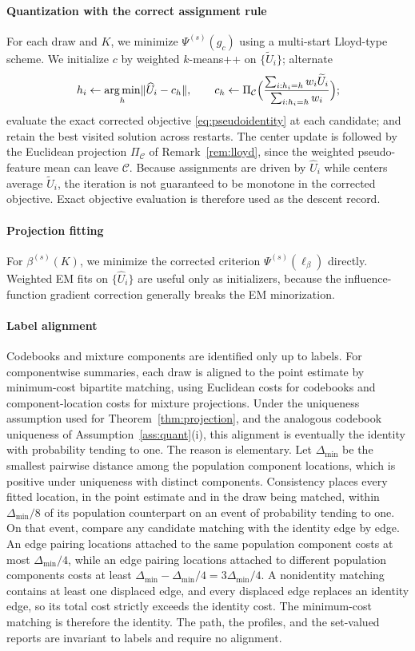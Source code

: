 \documentclass[11pt]{article}
\DeclareMathOperator*{\argmin}{arg\,min}
\newcommand{\calC}{\mathcal C}
\newcommand{\hU}{\widehat U}
\newcommand{\tU}{\widetilde U}
\newcommand{\norm}[1]{\lVert #1\rVert}
\begin{document}
\paragraph{Quantization with the correct assignment rule}
For each draw and $K$, we minimize $\Psi^{(s)}(g_c)$ using a multi-start Lloyd-type scheme.  We initialize $c$ by weighted $k$-means++ on $\{\tU_i\}$; alternate
\[
h_i\gets \argmin_h\norm{\hU_i-c_h},
\qquad
c_h\gets \Pi_{\calC}\Bigl(\frac{\sum_{i:h_i=h}w_i\tU_i}{\sum_{i:h_i=h}w_i}\Bigr);
\]
evaluate the exact corrected objective \eqref{eq:pseudoidentity} at each candidate; and retain the best visited solution across restarts. The center update is followed by the Euclidean projection $\Pi_{\calC}$ of Remark~\ref{rem:lloyd}, since the weighted pseudo-feature mean can leave $\calC$.  Because assignments are driven by $\hU_i$ while centers average $\tU_i$, the iteration is not guaranteed to be monotone in the corrected objective.  Exact objective evaluation is therefore used as the descent record.

\paragraph{Projection fitting}
For $\beta^{(s)}(K)$, we minimize the corrected criterion $\Psi^{(s)}(\ell_\beta)$ directly.  Weighted EM fits on $\{\hU_i\}$ are useful only as initializers, because the influence-function gradient correction generally breaks the EM minorization.

\paragraph{Label alignment}
Codebooks and mixture components are identified only up to labels.  For componentwise summaries, each draw is aligned to the point estimate by minimum-cost bipartite matching, using Euclidean costs for codebooks and component-location costs for mixture projections.  Under the uniqueness assumption used for Theorem~\ref{thm:projection}, and the analogous codebook uniqueness of Assumption~\ref{ass:quant}\textup{(i)}, this alignment is eventually the identity with probability tending to one. The reason is elementary. Let $\Delta_{\min}$ be the smallest pairwise distance among the population component locations, which is positive under uniqueness with distinct components. Consistency places every fitted location, in the point estimate and in the draw being matched, within $\Delta_{\min}/8$ of its population counterpart on an event of probability tending to one. On that event, compare any candidate matching with the identity edge by edge. An edge pairing locations attached to the same population component costs at most $\Delta_{\min}/4$, while an edge pairing locations attached to different population components costs at least $\Delta_{\min}-\Delta_{\min}/4=3\Delta_{\min}/4$. A nonidentity matching contains at least one displaced edge, and every displaced edge replaces an identity edge, so its total cost strictly exceeds the identity cost. The minimum-cost matching is therefore the identity.  The path, the profiles, and the set-valued reports are invariant to labels and require no alignment.
\end{document}
